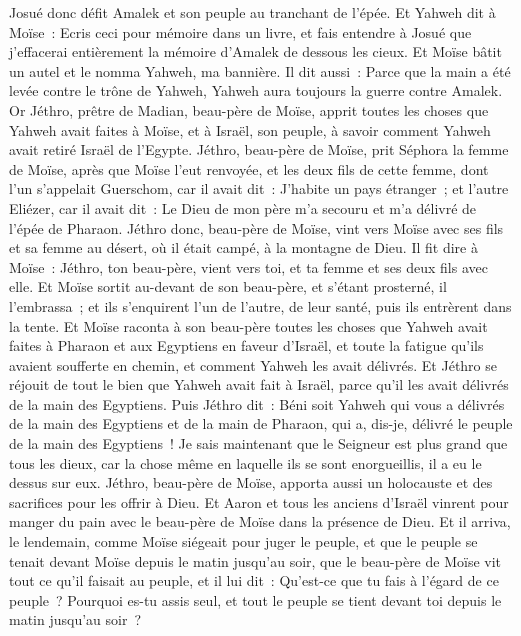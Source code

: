 \begin{multicols}{2}
Josué donc défit Amalek et son peuple au tranchant de l'épée.
Et Yahweh dit à Moïse~: Ecris ceci pour mémoire dans un livre, et fais entendre à Josué que j'effacerai entièrement la mémoire d'Amalek de dessous les cieux.
Et Moïse bâtit un autel et le nomma Yahweh, ma bannière.
Il dit aussi~: Parce que la main a été levée contre le trône de Yahweh, Yahweh aura toujours la guerre contre Amalek.
\VerseOne{}Or Jéthro, prêtre de Madian, beau-père de Moïse, apprit toutes les choses que Yahweh avait faites à Moïse, et à Israël, son peuple, à savoir comment Yahweh avait retiré Israël de l'Egypte.
Jéthro, beau-père de Moïse, prit Séphora la femme de Moïse, après que Moïse l'eut renvoyée,
et les deux fils de cette femme, dont l'un s'appelait Guerschom, car il avait dit~: J'habite un pays étranger~;
et l'autre Eliézer, car il avait dit~: Le Dieu de mon père m'a secouru et m'a délivré de l'épée de Pharaon.
Jéthro donc, beau-père de Moïse, vint vers Moïse avec ses fils et sa femme au désert, où il était campé, à la montagne de Dieu.
Il fit dire à Moïse~: Jéthro, ton beau-père, vient vers toi, et ta femme et ses deux fils avec elle.
Et Moïse sortit au-devant de son beau-père, et s'étant prosterné, il l'embrassa~; et ils s'enquirent l'un de l'autre, de leur santé, puis ils entrèrent dans la tente.
Et Moïse raconta à son beau-père toutes les choses que Yahweh avait faites à Pharaon et aux Egyptiens en faveur d'Israël, et toute la fatigue qu'ils avaient soufferte en chemin, et comment Yahweh les avait délivrés.
Et Jéthro se réjouit de tout le bien que Yahweh avait fait à Israël, parce qu'il les avait délivrés de la main des Egyptiens.
Puis Jéthro dit~: Béni soit Yahweh qui vous a délivrés de la main des Egyptiens et de la main de Pharaon, qui a, dis-je, délivré le peuple de la main des Egyptiens~!
Je sais maintenant que le Seigneur est plus grand que tous les dieux, car la chose même en laquelle ils se sont enorgueillis, il a eu le dessus sur eux.
Jéthro, beau-père de Moïse, apporta aussi un holocauste et des sacrifices pour les offrir à Dieu. Et Aaron et tous les anciens d'Israël vinrent pour manger du pain avec le beau-père de Moïse dans la présence de Dieu.
Et il arriva, le lendemain, comme Moïse siégeait pour juger le peuple, et que le peuple se tenait devant Moïse depuis le matin jusqu'au soir,
que le beau-père de Moïse vit tout ce qu'il faisait au peuple, et il lui dit~: Qu'est-ce que tu fais à l'égard de ce peuple~? Pourquoi es-tu assis seul, et tout le peuple se tient devant toi depuis le matin jusqu'au soir~?

\end{multicols}
